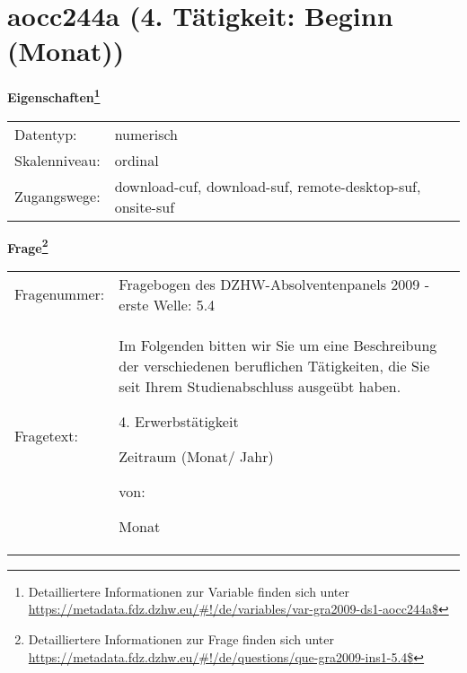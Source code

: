 
    \setcounter{footnote}{0}

    \vspace*{-1.8cm}
	\section{aocc244a (4. Tätigkeit: Beginn (Monat))}
	\label{section:aocc244a}



    \vspace*{0.5cm}
    \noindent\textbf{Eigenschaften\footnote{Detailliertere Informationen zur Variable finden sich unter
		\url{https://metadata.fdz.dzhw.eu/\#!/de/variables/var-gra2009-ds1-aocc244a$}}}\\
	\begin{tabularx}{\hsize}{@{}lX}
	Datentyp: & numerisch \\
	Skalenniveau: & ordinal \\
	Zugangswege: &
	  download-cuf, 
	  download-suf, 
	  remote-desktop-suf, 
	  onsite-suf
 \\
    \end{tabularx}



				\vspace*{0.5cm}
                \noindent\textbf{Frage\footnote{Detailliertere Informationen zur Frage finden sich unter
		              \url{https://metadata.fdz.dzhw.eu/\#!/de/questions/que-gra2009-ins1-5.4$}}}\\
				\begin{tabularx}{\hsize}{@{}lX}
					Fragenummer: &
					  Fragebogen des DZHW-Absolventenpanels 2009 - erste Welle:
					  5.4
 \\
					Fragetext: & Im Folgenden bitten wir Sie um eine Beschreibung der verschiedenen beruflichen Tätigkeiten, die Sie seit Ihrem Studienabschluss ausgeübt haben.\par  4. Erwerbstätigkeit\par  Zeitraum (Monat/ Jahr)\par  von:\par  Monat \\
				\end{tabularx}





